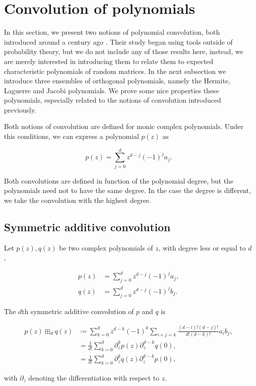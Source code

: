 \section{Convolution of polynomials}

In this section, we present two notions of polynomial convolution, both introduced around a century ago \cite{walsh1922location} \cite{szeg1939orthogonal}. Their study began using tools outside of probability theory, but we do not include any of those results here, instead, we are merely interested in introducing them to relate them to expected characteristic polynomials of random matrices. In the next subsection we introduce three ensembles of orthogonal polynomials, namely the Hermite, Laguerre and Jacobi polynomials. We prove some nice properties these polynomials, especially related to the notions of convolution introduced previously. 

Both notions of convolution are defined for monic complex polynomials. Under this conditions, we can express a polynomial $p(z)$ as

\begin{equation*}
    p(z) = \sum_{j=0}^d z^{d-j}(-1)^{j}a_j.
\end{equation*}

Both convolutions are defined in function of the polynomial degree, but the polynomials need not to have the same degree. In the case the degree is different, we take the convolution with the highest degree. 

\subsection{Symmetric additive convolution}

\begin{definition}\label{def:symadconv}
    Let $p(z), q(z)$ be two complex polynomials of $z$, with degree less or equal to $d$,

    \begin{align*}
        p(z) &= \sum_{j=0}^d z^{d-j}(-1)^{j}a_j,\\
        q(z) &= \sum_{j=0}^d z^{d-j}(-1)^{j}b_j.
    \end{align*}

    The $d$th symmetric additive convolution of $p$ and $q$ is

    \begin{align*}
        p(z) \boxplus_d q(z) &\coloneqq \sum_{k=0}^d z^{d-k}(-1)^k \sum_{i+j = k} \frac{(d-i)!(d-j)!}{d!(d-k)!}a_i b_j, \\
        &= \frac{1}{d!}\sum_{k=0}^d \partial_z^k p(z)\partial_z^{d-k}q(0),\\
        &= \frac{1}{d!}\sum_{k=0}^d \partial_z^k q(z)\partial_z^{d-k}p(0),
    \end{align*}

    \noindent with $\partial_z$ denoting the differentiation with respect to $z$.
\end{definition}


